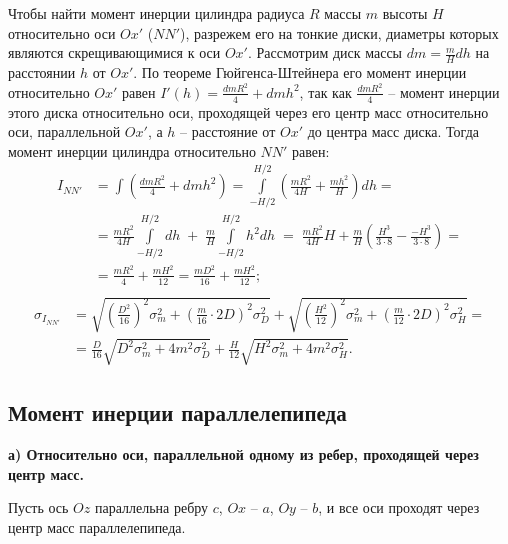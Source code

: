 \documentclass[a4paper, 12pt]{article}
\begin{document}
        Чтобы найти момент инерции цилиндра радиуса $R$ массы $m$ высоты $H$ относительно оси $Ox'$ ($NN'$), разрежем его на тонкие диски, диаметры которых являются скрещивающимися к оси $Ox'$. Рассмотрим диск массы $dm = \frac{m}{H}dh$ на расстоянии $h$ от $Ox'$. По теореме Гюйгенса-Штейнера его момент инерции относительно $Ox'$ равен $I'(h) = \frac{dmR^2}{4} + dmh^2$, так как $\frac{dmR^2}{4}$ -- момент инерции этого диска относительно оси, проходящей через его центр масс относительно оси, параллельной $Ox'$, а $h$ -- расстояние от $Ox'$ до центра масс диска. Тогда момент инерции цилиндра относительно $NN'$ равен:
        \begin{equation*}
            \begin{aligned}
            I_{NN'} & = \int \left(\frac{dmR^2}{4} + dmh^2\right) =
            \int\limits_{-H/2}^{H/2} \left(\frac{mR^2}{4H} + \frac{mh^2}{H}\right)dh = \\
            & = \frac{mR^2}{4H}\int\limits_{-H/2}^{H/2} dh\;+\;\frac{m}{H}\int\limits_{-H/2}^{H/2} h^2dh\;=\;
            \frac{mR^2}{4H}H + \frac{m}{H}\left(\frac{H^3}{3 \cdot 8} - \frac{-H^3}{3 \cdot 8}\right) = \\
            & = \frac{mR^2}{4} + \frac{mH^2}{12} = \frac{mD^2}{16} + \frac{mH^2}{12}; \\
            \end{aligned}
        \end{equation*}
        \begin{equation*}
            \begin{aligned}
            \sigma_{I_{NN'}} & = 
            \sqrt{\left(\frac{D^2}{16}\right)^2\sigma_m^2 + \left(\frac{m}{16}\cdot2D\right)^2\sigma_D^2} +
            \sqrt{\left(\frac{H^2}{12}\right)^2\sigma_m^2 + \left(\frac{m}{12}\cdot2D\right)^2\sigma_H^2} = \\
            & = \frac{D}{16}\sqrt{D^2\sigma_m^2+4m^2\sigma_D^2} +
            \frac{H}{12}\sqrt{H^2\sigma_m^2+4m^2\sigma_H^2}.
            \end{aligned}
        \end{equation*}

        \subsection*{Момент инерции параллелепипеда}

        \textbf{а) Относительно оси, параллельной одному из ребер, проходящей через центр масс.}

        Пусть ось $Oz$ параллельна ребру $c$, $Ox$ -- $a$, $Oy$ -- $b$, и все оси проходят через центр масс параллелепипеда.
\end{document}
